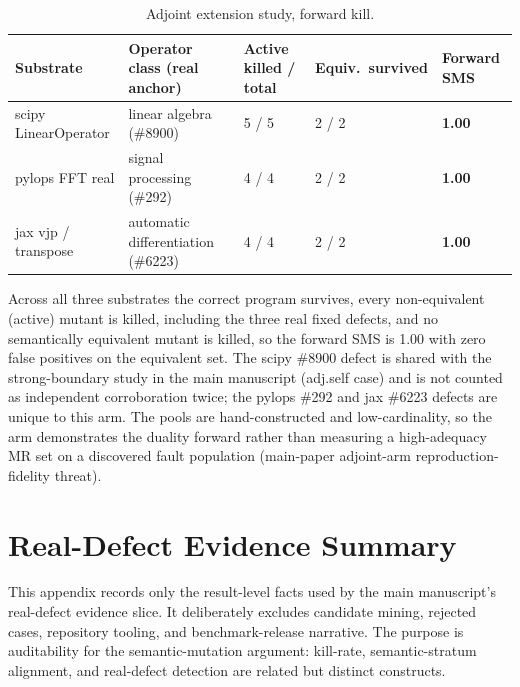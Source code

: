\documentclass[review,12pt,authoryear]{elsarticle}
\begin{document}
{\def\LTcaptype{table} %
\begin{longtable}[]{@{}p{2.0cm}p{3.2cm}p{2.5cm}p{1.8cm}p{1.8cm}@{}}
\caption{Adjoint extension study, forward kill.}\label{tab:suppl-adjoint}\\
\toprule\noalign{}
Substrate & Operator class (real anchor) & Active killed / total & Equiv.\ survived & Forward SMS \\
\midrule\noalign{}
\endfirsthead
\endhead
\bottomrule\noalign{}
\endlastfoot
scipy LinearOperator & linear algebra (\#8900) & 5 / 5 & 2 / 2 & \textbf{1.00} \\
pylops FFT real & signal processing (\#292) & 4 / 4 & 2 / 2 & \textbf{1.00} \\
jax vjp / transpose & automatic differentiation (\#6223) & 4 / 4 & 2 / 2 & \textbf{1.00} \\
\end{longtable}
}

Across all three substrates the correct program survives, every
non-equivalent (active) mutant is killed, including the three real
fixed defects, and no semantically equivalent mutant is killed, so the
forward SMS is 1.00 with zero false positives on the equivalent set. The
scipy \#8900 defect is shared with the strong-boundary study in the main manuscript (adj.self case)
and is not counted as independent corroboration twice; the pylops \#292
and jax \#6223 defects are unique to this arm. The pools are
hand-constructed and low-cardinality, so the arm demonstrates the duality
forward rather than measuring a high-adequacy MR set on a discovered fault
population (main-paper adjoint-arm reproduction-fidelity threat).

\section{Real-Defect Evidence Summary}\label{i.-result-level-real-defect-evidence-ledger}

This appendix records only the result-level facts used by the main
manuscript's real-defect evidence slice. It deliberately excludes
candidate mining, rejected cases, repository tooling, and benchmark-release
narrative. The purpose is auditability for the semantic-mutation argument:
kill-rate, semantic-stratum alignment, and real-defect detection are related
but distinct constructs.
\end{document}
